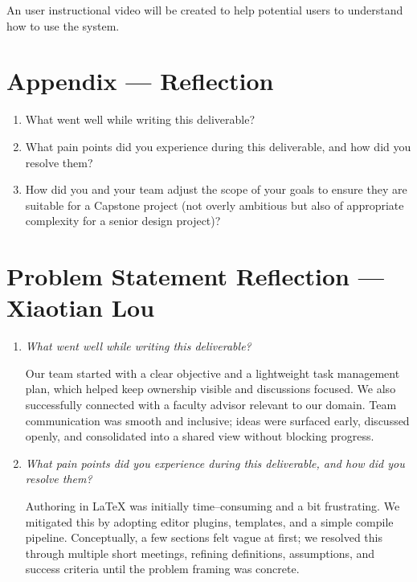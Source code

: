\documentclass{article}
\begin{document}
An user instructional video will be created to help potential users to
understand how to use the system.

\newpage{}

\section*{Appendix --- Reflection}




\begin{enumerate}
    \item What went well while writing this deliverable?
    \item What pain points did you experience during this deliverable, and how did you
          resolve them?
    \item How did you and your team adjust the scope of your goals to ensure they are
          suitable for a Capstone project (not overly ambitious but also of appropriate
          complexity for a senior design project)?
\end{enumerate}
\section*{Problem Statement Reflection --- Xiaotian Lou}

\begin{enumerate}
  \item \textit{What went well while writing this deliverable?}

  Our team started with a clear objective and a lightweight task
  management plan, which helped keep ownership visible and discussions
  focused. We also successfully connected with a faculty advisor relevant
  to our domain. Team communication was smooth and inclusive; ideas were
  surfaced early, discussed openly, and consolidated into a shared view
  without blocking progress.

  \item \textit{What pain points did you experience during this deliverable, and how did you resolve them?}

  Authoring in \LaTeX{} was initially time--consuming and a bit
  frustrating. We mitigated this by adopting editor plugins, templates,
  and a simple compile pipeline. Conceptually, a few sections felt vague
  at first; we resolved this through multiple short meetings, refining
  definitions, assumptions, and success criteria until the problem
  framing was concrete.

\end{enumerate}



\end{document}
